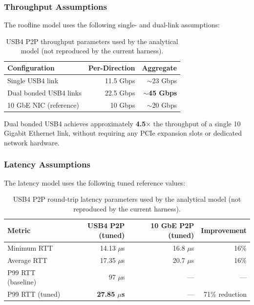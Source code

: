 \documentclass[11pt,a4paper]{article}
\begin{document}
\subsubsection{Throughput Assumptions}
The roofline model uses the following single- and dual-link assumptions:

\begin{table}[ht!]
\centering
\caption{USB4 P2P throughput parameters used by the analytical model (not reproduced by the current harness).}
\vspace{0.2cm}
\begin{tabular}{l r r}
\toprule
\textbf{Configuration} & \textbf{Per-Direction} & \textbf{Aggregate} \\
\midrule
Single USB4 link & 11.5 Gbps & $\sim$23 Gbps \\
Dual bonded USB4 links & 22.5 Gbps & $\sim$\textbf{45 Gbps} \\
10 GbE NIC (reference) & 10 Gbps & $\sim$20 Gbps \\
\bottomrule
\end{tabular}
\label{tab:usb4_throughput}
\end{table}

\noindent Dual bonded USB4 achieves approximately \textbf{4.5$\times$} the throughput of a single 10 Gigabit Ethernet link, without requiring any PCIe expansion slots or dedicated network hardware.

\subsubsection{Latency Assumptions}
The latency model uses the following tuned reference values:

\begin{table}[ht!]
\centering
\caption{USB4 P2P round-trip latency parameters used by the analytical model (not reproduced by the current harness).}
\vspace{0.2cm}
\begin{tabular}{l r r r}
\toprule
\textbf{Metric} & \textbf{USB4 P2P (tuned)} & \textbf{10 GbE P2P (tuned)} & \textbf{Improvement} \\
\midrule
Minimum RTT & 14.13 $\mu$s & 16.8 $\mu$s & 16\% \\
Average RTT & 17.35 $\mu$s & 20.7 $\mu$s & 16\% \\
P99 RTT (baseline) & 97 $\mu$s & --- & --- \\
P99 RTT (tuned) & \textbf{27.85 $\mu$s} & --- & 71\% reduction \\
\bottomrule
\end{tabular}
\label{tab:usb4_latency}
\end{table}
\end{document}

